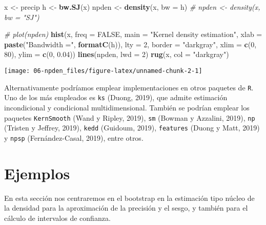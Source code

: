 \documentclass[]{book}
\newenvironment{Shaded}{\begin{snugshade}}{\end{snugshade}}
\newcommand{\KeywordTok}[1]{\textcolor[rgb]{0.13,0.29,0.53}{\textbf{#1}}}
\newcommand{\DataTypeTok}[1]{\textcolor[rgb]{0.13,0.29,0.53}{#1}}
\newcommand{\DecValTok}[1]{\textcolor[rgb]{0.00,0.00,0.81}{#1}}
\newcommand{\FloatTok}[1]{\textcolor[rgb]{0.00,0.00,0.81}{#1}}
\newcommand{\StringTok}[1]{\textcolor[rgb]{0.31,0.60,0.02}{#1}}
\newcommand{\CommentTok}[1]{\textcolor[rgb]{0.56,0.35,0.01}{\textit{#1}}}
\newcommand{\OtherTok}[1]{\textcolor[rgb]{0.56,0.35,0.01}{#1}}
\newcommand{\NormalTok}[1]{#1}
\theoremstyle{break}
\theoremstyle{definition}
\theoremstyle{definition}
\theoremstyle{definition}
\theoremstyle{remark}
\begin{document}
\begin{Shaded}
\begin{Highlighting}[]
\NormalTok{x <-}\StringTok{ }\NormalTok{precip}
\NormalTok{h <-}\StringTok{ }\KeywordTok{bw.SJ}\NormalTok{(x)}
\NormalTok{npden <-}\StringTok{ }\KeywordTok{density}\NormalTok{(x, }\DataTypeTok{bw =}\NormalTok{ h)}
\CommentTok{# npden <- density(x, bw = "SJ")}

\CommentTok{# plot(npden)}
\KeywordTok{hist}\NormalTok{(x, }\DataTypeTok{freq =} \OtherTok{FALSE}\NormalTok{, }\DataTypeTok{main =} \StringTok{"Kernel density estimation"}\NormalTok{,}
     \DataTypeTok{xlab =} \KeywordTok{paste}\NormalTok{(}\StringTok{"Bandwidth ="}\NormalTok{, }\KeywordTok{formatC}\NormalTok{(h)), }\DataTypeTok{lty =} \DecValTok{2}\NormalTok{,}
     \DataTypeTok{border =} \StringTok{"darkgray"}\NormalTok{, }\DataTypeTok{xlim =} \KeywordTok{c}\NormalTok{(}\DecValTok{0}\NormalTok{, }\DecValTok{80}\NormalTok{), }\DataTypeTok{ylim =} \KeywordTok{c}\NormalTok{(}\DecValTok{0}\NormalTok{, }\FloatTok{0.04}\NormalTok{))}
\KeywordTok{lines}\NormalTok{(npden, }\DataTypeTok{lwd =} \DecValTok{2}\NormalTok{)}
\KeywordTok{rug}\NormalTok{(x, }\DataTypeTok{col =} \StringTok{"darkgray"}\NormalTok{)}
\end{Highlighting}
\end{Shaded}

\begin{center}\texttt{[image: 06-npden\_files/figure-latex/unnamed-chunk-2-1]} \end{center}

Alternativamente podríamos emplear implementaciones en otros paquetes de
\texttt{R}. Uno de los más empleados es \texttt{ks} (Duong, 2019), que
admite estimación incondicional y condicional multidimensional. También
se podrían emplear los paquetes \texttt{KernSmooth} (Wand y Ripley,
2019), \texttt{sm} (Bowman y Azzalini, 2019), \texttt{np} (Tristen y
Jeffrey, 2019), \texttt{kedd} (Guidoum, 2019), \texttt{features} (Duong
y Matt, 2019) y \texttt{npsp} (Fernández-Casal, 2019), entre otros.

\section{Ejemplos}\label{ejemplos-1}

En esta sección nos centraremos en el bootstrap en la estimación tipo
núcleo de la densidad para la aproximación de la precisión y el sesgo, y
también para el cálculo de intervalos de confianza.
\end{document}
